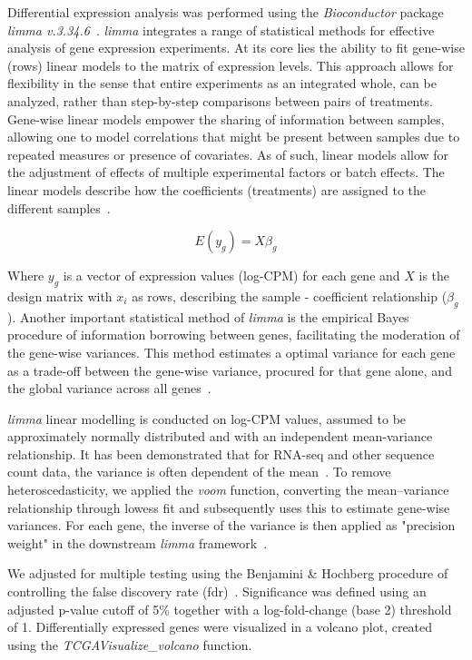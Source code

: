 \documentclass[10pt,letterpaper]{article}
\begin{document}
Differential expression analysis was performed using the \textit{Bioconductor} package \textit{limma v.3.34.6}~\cite{Ritchie2015}.
\textit{limma} integrates a range of statistical methods for effective analysis of gene expression experiments. At its core lies the ability to fit gene-wise (rows) linear models to the matrix of expression levels. This approach allows for flexibility in the sense that entire experiments as an integrated whole, can be analyzed, rather than step-by-step comparisons between pairs of treatments. Gene-wise linear models empower the sharing of information between samples, allowing one to model correlations that might be present between samples due to repeated measures or presence of covariates. As of such, linear models allow for the adjustment of effects of multiple experimental factors or batch effects.
The linear models describe how the coefficients (treatments) are assigned to the different samples~\cite{Ritchie2015}.

\begin{equation*}

E(y_{g})=X\beta_{g}

\end{equation*}

Where $y_{g}$ is a vector of expression values (log-CPM) for each gene and $X$ is the design matrix with $x_{i}$ as rows, describing the sample - coefficient relationship ($\beta_{g}$).   
Another important statistical method of \textit{limma} is the empirical Bayes procedure of information borrowing between genes, facilitating the moderation of the gene-wise variances. This method estimates a optimal variance for each gene as a trade-off between the gene-wise variance, procured for that gene alone, and the global variance across all genes~\cite{Ritchie2015}. 

\textit{limma} linear modelling is conducted on log-CPM values, assumed to be approximately normally distributed and with an independent mean-variance relationship. It has been demonstrated that for RNA-seq and other sequence count data, the variance is often dependent of the mean~\cite{Law2016}. To remove heteroscedasticity, we applied the \textit{voom} function, converting the mean–variance relationship through lowess fit and subsequently uses this to estimate gene-wise variances. For each gene, the inverse of the variance is then applied as "precision weight" in the downstream \textit{limma} framework~\cite{Law2014}.

We adjusted for multiple testing using the Benjamini \& Hochberg procedure of controlling the false discovery rate (fdr)~\cite{Benajmini1995}. Significance was defined using an adjusted p-value cutoff of 5\% together with a log-fold-change (base 2) threshold of 1. Differentially expressed genes were visualized in a volcano plot, created using the \textit{TCGAVisualize\_volcano} function.
\end{document}
